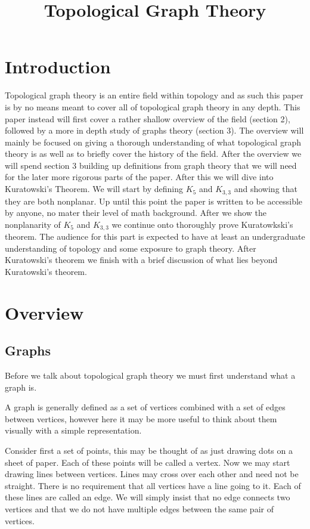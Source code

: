 \documentclass{article}
\title{Topological Graph Theory}
\begin{document}
\maketitle
\tableofcontents



\section{Introduction}
Topological graph theory is an entire field within topology and as such this paper is by no means meant to cover all of topological graph theory in any depth. This paper instead will first cover a rather shallow overview of the field (section 2), followed by a more in depth study of graphs theory (section 3). The overview will mainly be focused on giving a thorough understanding of what topological graph theory is as well as to briefly cover the history of the field. After the overview we will spend section 3 building up definitions from graph theory that we will need for the later more rigorous parts of the paper. After this we will dive into Kuratowski's Theorem. We will start by defining $K_5$ and $K_{3,3}$ and showing that they are both nonplanar. Up until this point the paper is written to be accessible by anyone, no mater their level of math background. After we show the nonplanarity of $K_5$ and $K_{3,3}$ we continue onto thoroughly prove Kuratowkski's theorem. The audience for this part is expected to have at least an undergraduate understanding of topology and some exposure to graph theory. After Kuratowski's theorem we finish with a brief discussion of what lies beyond Kuratowski's theorem.

\section{Overview}
\subsection{Graphs}
Before we talk about topological graph theory we must first understand what a graph is.

A graph is generally defined as a set of vertices combined with a set of edges between vertices, however here it may be more useful to think about them visually with a simple representation.

Consider first a set of points, this may be thought of as just drawing dots on a sheet of paper. Each of these points will be called a vertex. Now we may start drawing lines between vertices. Lines may cross over each other and need not be straight. There is no requirement that all vertices have a line going to it. Each of these lines are called an edge. We will simply insist that no edge connects two vertices and that we do not have multiple edges between the same pair of vertices.
\end{document}
